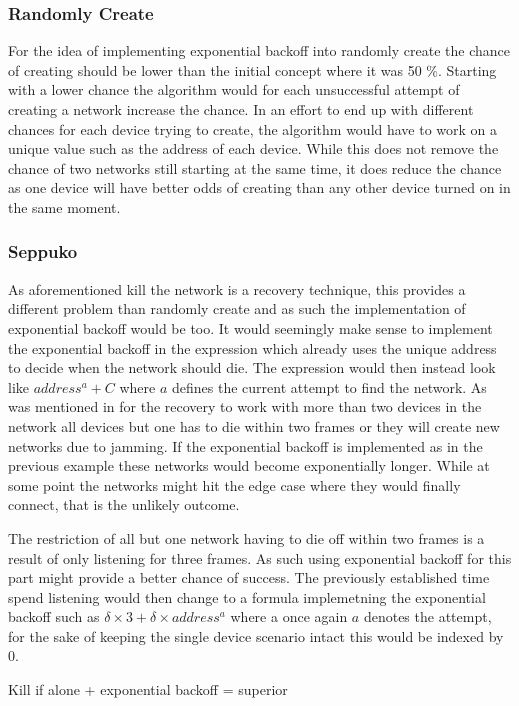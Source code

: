 \subsubsection*{Randomly Create}
For the idea of implementing exponential backoff into randomly create the chance of creating should be lower than the initial concept where it was 50 \%.
Starting with a lower chance the algorithm would for each unsuccessful attempt of creating a network increase the chance.
In an effort to end up with different chances for each device trying to create, the algorithm would have to work on a unique value such as the address of each device.
While this does not remove the chance of two networks still starting at the same time, it does reduce the chance as one device will have better odds of creating than any other device turned on in the same moment.
\subsubsection*{Seppuko}
As aforementioned kill the network is a recovery technique, this provides a different problem than randomly create and as such the implementation of exponential backoff would be too.
It would seemingly make sense to implement the exponential backoff in the expression which already uses the unique address to decide when the network should die.
The expression would then instead look like $address^a + C$ where $a$ defines the current attempt to find the network.
As was mentioned in  for the recovery to work with more than two devices in the network all devices but one has to die within two frames or they will create new networks due to jamming.
If the exponential backoff is implemented as in the previous example these networks would become exponentially longer.
While at some point the networks might hit the edge case where they would finally connect, that is the unlikely outcome.

\bigskip \noindent
The restriction of all but one network having to die off within two frames is a result of only listening for three frames.
As such using exponential backoff for this part might provide a better chance of success.
The previously established time spend listening would then change to a formula implemetning the exponential backoff such as $\delta \times 3 + \delta \times address^a$ where a once again $a$ denotes the attempt, for the sake of keeping the single device scenario intact this would be indexed by 0.

Kill if alone + exponential backoff = superior